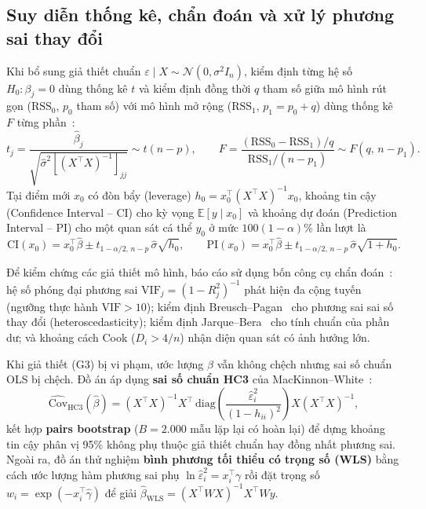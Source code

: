 \subsection{Suy diễn thống kê, chẩn đoán và xử lý phương sai thay đổi}
Khi bổ sung giả thiết chuẩn $\varepsilon \mid X \sim \mathcal{N}(0, \sigma^2 I_n)$, kiểm định từng hệ số $H_0\!: \beta_j = 0$ dùng thống kê $t$ và kiểm định đồng thời $q$ tham số giữa mô hình rút gọn ($\mathrm{RSS}_0$, $p_0$ tham số) với mô hình mở rộng ($\mathrm{RSS}_1$, $p_1 = p_0 + q$) dùng thống kê $F$ từng phần~\cite[Chương~8]{len2023phantichdulieu}:
\begin{equation}
  t_j = \frac{\hat\beta_j}{\sqrt{\hat\sigma^2 [(X^\top X)^{-1}]_{jj}}} \sim t(n-p), \qquad
  F = \frac{(\mathrm{RSS}_0 - \mathrm{RSS}_1)/q}{\mathrm{RSS}_1/(n - p_1)} \sim F(q,\, n - p_1).
  \label{eq:t-f}
\end{equation}
Tại điểm mới $x_0$ có đòn bẩy (leverage) $h_0 = x_0^\top (X^\top X)^{-1} x_0$, khoảng tin cậy (Confidence Interval -- CI) cho kỳ vọng $\mathbb{E}[y \mid x_0]$ và khoảng dự đoán (Prediction Interval -- PI) cho một quan sát cá thể $y_0$ ở mức $100(1-\alpha)\%$ lần lượt là
\begin{equation}
  \mathrm{CI}(x_0) = x_0^\top \hat\beta \pm t_{1-\alpha/2,\,n-p}\,\hat\sigma\sqrt{h_0}, \qquad
  \mathrm{PI}(x_0) = x_0^\top \hat\beta \pm t_{1-\alpha/2,\,n-p}\,\hat\sigma\sqrt{1 + h_0}.
  \label{eq:ci-pi}
\end{equation}

Để kiểm chứng các giả thiết mô hình, báo cáo sử dụng bốn công cụ chẩn đoán~\cite{len2023phantichdulieu, james2021islr}: hệ số phóng đại phương sai $\mathrm{VIF}_j = (1 - R_j^2)^{-1}$ phát hiện đa cộng tuyến (ngưỡng thực hành $\mathrm{VIF} > 10$); kiểm định Breusch--Pagan~\cite{breusch1979test} cho phương sai sai số thay đổi (heteroscedasticity); kiểm định Jarque--Bera~\cite{jarque1980efficient} cho tính chuẩn của phần dư; và khoảng cách Cook ($D_i > 4/n$) nhận diện quan sát có ảnh hưởng lớn.

Khi giả thiết (G3) bị vi phạm, ước lượng $\hat\beta$ vẫn không chệch nhưng sai số chuẩn OLS bị chệch. Đồ án áp dụng \textbf{sai số chuẩn HC3} của MacKinnon--White~\cite{mackinnon1985hc}:
\begin{equation}
  \widehat{\mathrm{Cov}}_{\mathrm{HC3}}(\hat\beta) = (X^\top X)^{-1} X^\top \,\mathrm{diag}\!\left(\frac{\hat\varepsilon_i^2}{(1 - h_{ii})^2}\right) X (X^\top X)^{-1},
  \label{eq:hc3}
\end{equation}
kết hợp \textbf{pairs bootstrap} ($B = 2.000$ mẫu lặp lại có hoàn lại) để dựng khoảng tin cậy phân vị 95\% không phụ thuộc giả thiết chuẩn hay đồng nhất phương sai. Ngoài ra, đồ án thử nghiệm \textbf{bình phương tối thiểu có trọng số (WLS)} bằng cách ước lượng hàm phương sai phụ $\ln \hat\varepsilon_i^2 = x_i^\top \gamma$ rồi đặt trọng số $w_i = \exp(-x_i^\top \hat\gamma)$ để giải $\hat\beta_{\mathrm{WLS}} = (X^\top W X)^{-1} X^\top W y$.

